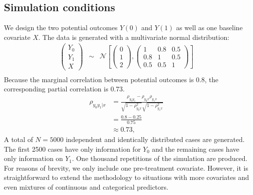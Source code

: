	\subsection{Simulation conditions}
	\label{sec:4.5.1}
	We design the two potential outcomes $Y(0)$ and $Y(1)$ as well as one baseline covariate $X$. The data is generated with a multivariate normal distribution:
	\begin{eqnarray*}
		\begin{pmatrix}Y_{0}\\
			Y_{1}\\
			X
		\end{pmatrix} & \sim & \mathcal{N}\left[\left(\begin{array}{c}
			0\\
			1\\
			2
		\end{array}\right),\left(\begin{array}{ccc}
			1 & 0.8 & 0.5\\
			0.8 & 1 & 0.5\\
			0.5 & 0.5 & 1
		\end{array}\right)\right]\\
	\end{eqnarray*}
	Because the marginal correlation between potential outcomes is 0.8, the corresponding partial correlation is 0.73. 
	\begin{equation}
		\begin{array}{cl}
			\rho_{y_{0}y_{1}|x} &= \frac{\rho_{y_{0}y_{1}} - \rho_{y_{0}x}\rho_{y_{1}x}}{\sqrt{1 - \rho_{y_{0}x}^2}\sqrt{1 - \rho_{y_{1}x}^2}} \\
			&= \frac{0.8 - 0.25}{0.75}\\
			&\approx 0.73,
		\end{array}
	\end{equation}
	A total of $N = 5000$ independent and identically distributed cases are generated. The first 2500 cases have only information for $Y_0$ and the remaining cases have only information on $Y_1$. One thousand repetitions of the simulation are produced. For reasons of brevity, we only include one pre-treatment covariate. However, it is straightforward to extend the methodology to situations with more covariates and even mixtures of continuous and categorical predictors.
